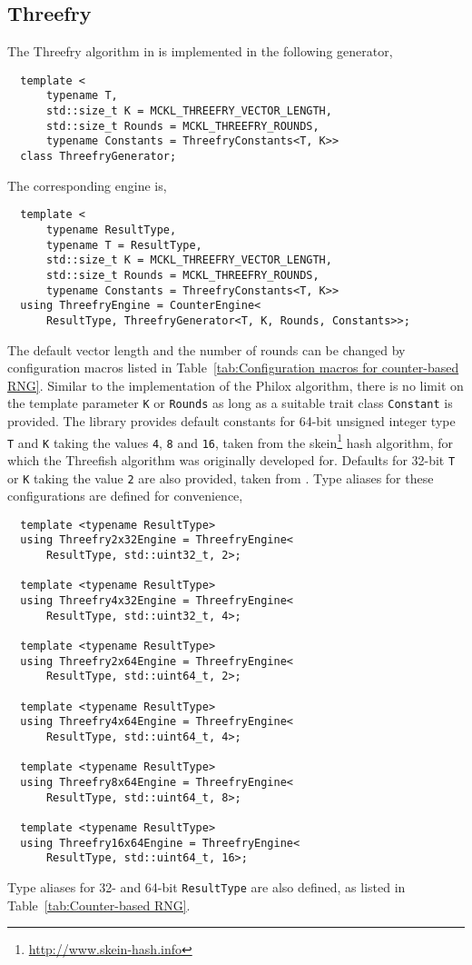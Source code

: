 \subsection{Threefry}
\label{sub:Threefry}

The Threefry algorithm in \textcite{Salmon:2011um} is implemented in the
following generator,
\begin{Verbatim}
  template <
      typename T,
      std::size_t K = MCKL_THREEFRY_VECTOR_LENGTH,
      std::size_t Rounds = MCKL_THREEFRY_ROUNDS,
      typename Constants = ThreefryConstants<T, K>>
  class ThreefryGenerator;
\end{Verbatim}
The corresponding \rng engine is,
\begin{Verbatim}
  template <
      typename ResultType,
      typename T = ResultType,
      std::size_t K = MCKL_THREEFRY_VECTOR_LENGTH,
      std::size_t Rounds = MCKL_THREEFRY_ROUNDS,
      typename Constants = ThreefryConstants<T, K>>
  using ThreefryEngine = CounterEngine<
      ResultType, ThreefryGenerator<T, K, Rounds, Constants>>;
\end{Verbatim}
The default vector length and the number of rounds can be changed by
configuration macros listed in Table~\ref{tab:Configuration macros for
  counter-based RNG}. Similar to the implementation of the Philox algorithm,
there is no limit on the template parameter \verb|K| or \verb|Rounds| as long
as a suitable trait class \verb|Constant| is provided. The library provides
default constants for 64-bit unsigned integer type \verb|T| and \verb|K| taking
the values \verb|4|, \verb|8| and \verb|16|, taken from the
skein\footnote{\url{http://www.skein-hash.info}} hash algorithm, for which the
Threefish algorithm was originally developed for. Defaults for 32-bit \verb|T|
or \verb|K| taking the value \verb|2| are also provided, taken from
\textcite{Salmon:2011um}. Type aliases for these configurations are defined for
convenience,
\begin{Verbatim}
  template <typename ResultType>
  using Threefry2x32Engine = ThreefryEngine<
      ResultType, std::uint32_t, 2>;

  template <typename ResultType>
  using Threefry4x32Engine = ThreefryEngine<
      ResultType, std::uint32_t, 4>;

  template <typename ResultType>
  using Threefry2x64Engine = ThreefryEngine<
      ResultType, std::uint64_t, 2>;

  template <typename ResultType>
  using Threefry4x64Engine = ThreefryEngine<
      ResultType, std::uint64_t, 4>;

  template <typename ResultType>
  using Threefry8x64Engine = ThreefryEngine<
      ResultType, std::uint64_t, 8>;

  template <typename ResultType>
  using Threefry16x64Engine = ThreefryEngine<
      ResultType, std::uint64_t, 16>;
\end{Verbatim}
Type aliases for 32- and 64-bit \verb|ResultType| are also defined, as listed
in Table~\ref{tab:Counter-based RNG}.

